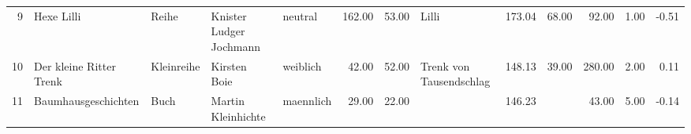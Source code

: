 \begin{sidewaystable}[ht]
\begin{center}
{\begin{tabular}{rllllrrlrrrrr}
  9 & Hexe Lilli                                                                                                                                                                                                                                                      & Reihe & Knister Ludger Jochmann                                                                                                                                                                                                                                         & neutral & 162.00 & 53.00 & Lilli                                                                                                                                                                                                                                                           & 173.04 & 68.00 & 92.00 & 1.00 & -0.51 \\ 
  10 & Der kleine Ritter Trenk                                                                                                                                                                                                                                         & Kleinreihe & Kirsten Boie                                                                                                                                                                                                                                                    & weiblich & 42.00 & 52.00 & Trenk von Tausendschlag                                                                                                                                                                                                                                         & 148.13 & 39.00 & 280.00 & 2.00 & 0.11 \\ 
  11 & Baumhausgeschichten                                                                                                                                                                                                                                             & Buch & Martin Kleinhichte                                                                                                                                                                                                                                              & maennlich & 29.00 & 22.00 &                                                                                                                                                                                                                                                                 & 146.23 &  & 43.00 & 5.00 & -0.14 \\ 

\end{tabular}}
\end{center}
\end{sidewaystable}
